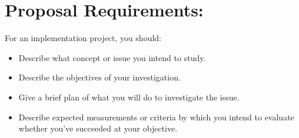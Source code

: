 \documentclass[12pt]{report}
\begin{document}
	
	
	\pagebreak %
	
	\tableofcontents
	
	\pagebreak
	
    \section{Proposal Requirements:}
    For an implementation project, you should:
    \begin{itemize}
        \item Describe what concept or issue you intend to study. 
        \item Describe the objectives of your investigation. 
        \item Give a brief plan of what you will do to investigate the issue. 
        \item Describe expected measurements or criteria by which you intend to
            evaluate whether you've succeeded at your objective.
    \end{itemize}
\end{document}

